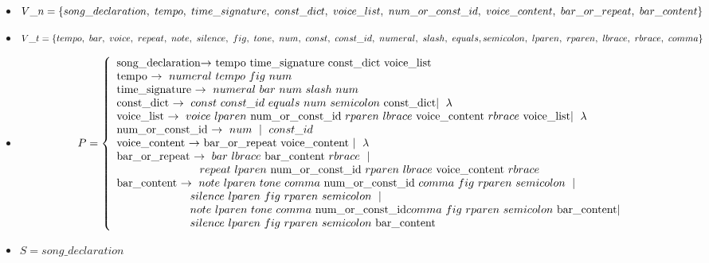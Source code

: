 \documentclass[a4paper, 10pt, twoside]{article}
\begin{document}
\begin{itemize}
\item $V\_n = \{song\_declaration,\ tempo,\ time\_signature,\ const\_dict,\ voice\_list,\ num\_or\_const\_id,\ voice\_content,\\ \ bar\_or\_repeat,\ bar\_content\}$

\item $V\_t = \{tempo,\ bar,\ voice,\ repeat,\ note,\ silence,\ fig,\ tone,\ num,\ const,\ const\_id,\  numeral,\ slash,\ equals,\\ semicolon,\ lparen,\ rparen,\ lbrace,\ rbrace,\ comma\}$

\item 
\begin{equation*}
  P = \left\lbrace
  \begin{array}{l}
      $song\_declaration$ \rightarrow\  $tempo\ time\_signature\ const\_dict\ voice\_list$ \\

  $tempo$\ \rightarrow\ numeral\ tempo\ fig\ num\\

  $time\_signature$\ \rightarrow\ numeral\ bar\ num\ slash\ num\\

  $const\_dict$\ \rightarrow\ const\ const\_id\ equals\ num\ semicolon\ $const\_dict$ \mid\ \lambda\\

  $voice\_list$\ \rightarrow\ voice\ lparen\ $num\_or\_const\_id$\ rparen\ lbrace\ $voice\_content$\ rbrace\ $voice\_list$ \mid\ \lambda\\

  $num\_or\_const\_id$\ \rightarrow\ num\ \mid\ const\_id\\

  $voice\_content$\ \rightarrow\ $bar\_or\_repeat\ voice\_content$\ \mid\ \lambda\\

  $bar\_or\_repeat$\ \rightarrow\ bar\ lbrace\ $bar\_content$\ rbrace\ \mid\ 
 \\ \-\hspace{2.5cm}\ repeat\ lparen\ $num\_or\_const\_id$\ rparen\ lbrace\ $voice\_content$\ rbrace\\

  $bar\_content$\ \rightarrow\ note\ lparen\ tone\ comma\ $num\_or\_const\_id$\ comma\ fig\ rparen\ semicolon\ \mid\ 
 \\ \-\hspace{2.2cm}\ silence\ lparen\ fig\ rparen\ semicolon\ \mid
 \\ \-\hspace{2.2cm}\ note\ lparen\ tone\ comma\ $num\_or\_const\_id$ comma\ fig\ rparen\ semicolon\ $bar\_content$\mid
 \\ \-\hspace{2.2cm}\ silence\ lparen\ fig\ rparen\ semicolon\ $bar\_content$

  \end{array}
  \right.
\end{equation*}
\item $S = song\_declaration$

\end{itemize}
\end{document}
